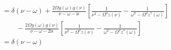 \begin{equation}
\begin{split}
&= \delta(\nu - \omega) + \frac{2\Omega g(\omega)g(\nu)}{\nu - \omega - \mathrm{i}\epsilon}\left[\frac{1}{\nu^2 - \Omega^2z(\nu)} - \frac{1}{\omega^2 - \Omega^2z^*(\omega)}\right]\\
&\qquad - \frac{2\Omega g(\omega)g(\nu)}{\nu - \omega - 2\mathrm{i}\epsilon}\left[\frac{1}{\nu^2 - \Omega^2z(\nu)} - \frac{1}{\omega^2 - \Omega^2z^*(\omega)}\right]\\
&= \delta(\nu - \omega)
\end{split}
\end{equation}
